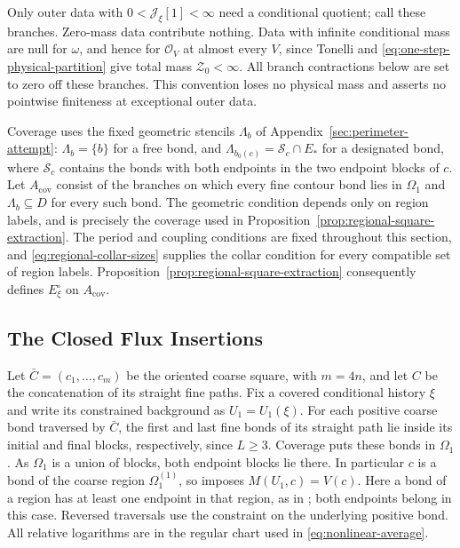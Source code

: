 \documentclass[11pt]{article}
\begin{document}
Only outer data with $0<\mathcal J_\xi[1]<\infty$ need a conditional quotient; call these branches. Zero-mass data contribute nothing. Data with infinite conditional mass are null for $\omega$, and hence for $\mathcal O_V$ at almost every $V$, since Tonelli and \eqref{eq:one-step-physical-partition} give total mass $\mathcal Z_0<\infty$. All branch contractions below are set to zero off these branches. This convention loses no physical mass and asserts no pointwise finiteness at exceptional outer data.

Coverage uses the fixed geometric stencils $\Lambda_b$ of Appendix~\ref{sec:perimeter-attempt}: $\Lambda_b=\{b\}$ for a free bond, and $\Lambda_{b_0(c)}=\mathcal S_c\cap E_*$ for a designated bond, where $\mathcal S_c$ contains the bonds with both endpoints in the two endpoint blocks of $c$. Let $A_{\mathrm{cov}}$ consist of the branches on which every fine contour bond lies in $\Omega_1$ and $\Lambda_b\subseteq D$ for every such bond. The geometric condition depends only on region labels, and is precisely the coverage used in Proposition~\ref{prop:regional-square-extraction}. The period and coupling conditions are fixed throughout this section, and \eqref{eq:regional-collar-sizes} supplies the collar condition for every compatible set of region labels. Proposition~\ref{prop:regional-square-extraction} consequently defines $E^\circ_\xi$ on $A_{\mathrm{cov}}$.

\subsection{The Closed Flux Insertions}

Let $\bar C=(c_1,\ldots,c_m)$ be the oriented coarse square, with $m=4n$, and let $C$ be the concatenation of its straight fine paths. Fix a covered conditional history $\xi$ and write its constrained background as $U_1=U_1(\xi)$. For each positive coarse bond traversed by $\bar C$, the first and last fine bonds of its straight path lie inside its initial and final blocks, respectively, since $L\geq3$. Coverage puts these bonds in $\Omega_1$. As $\Omega_1$ is a union of blocks, both endpoint blocks lie there. In particular $c$ is a bond of the coarse region $\Omega_1^{(1)}$, so \cite[(1.12)]{BalabanCRE} imposes $M(U_1,c)=V(c)$. Here a bond of a region has at least one endpoint in that region, as in \cite[Introduction]{BalabanVAR}; both endpoints belong in this case. Reversed traversals use the constraint on the underlying positive bond. All relative logarithms are in the regular chart used in \eqref{eq:nonlinear-average}.
\end{document}
